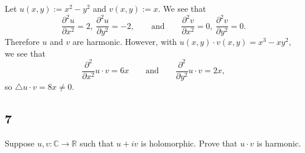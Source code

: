 \documentclass[12pt]{article}
\begin{document}
Let $u(x,y) := x^{2} - y^{2}$ and $v(x,y) := x$. We see that 
\[ \frac{\partial^{2}u}{\partial x^{2}} = 2, \ \frac{\partial^{2}u}{\partial y^{2}} = -2, \qquad \text{and}\qquad 
\frac{\partial^{2}v}{\partial x^{2}} = 0, \ \frac{\partial^{2}v}{\partial y^{2}} = 0. \]
Therefore $u$ and $v$ are harmonic. However, with $u(x,y)\cdot v(x,y) = x^{3} - xy^{2}$, we see that
\[ \frac{\partial^{2}}{\partial x^{2}}u\cdot v = 6x \qquad \text{and}\qquad \frac{\partial^{2}}{\partial y^{2}}u\cdot v = 2x, \]
so $\triangle u\cdot v = 8x \neq 0$.



\subsection*{7}
\begin{tcolorbox}
Suppose $u,v : \mathbb{C} \rightarrow \mathbb{R}$ such that $u + iv$ is holomorphic. Prove that $u\cdot v$ is harmonic.
\end{tcolorbox}
\end{document}
